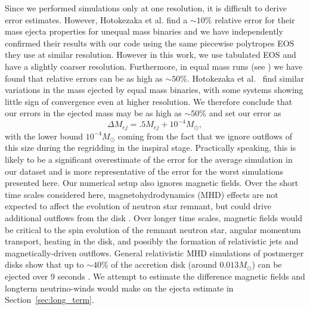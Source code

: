Since we performed simulations only at one resolution, it is difficult to derive error estimates. However, Hotokezaka et al. \cite{hotokezaka:13} find a $\sim 10\%$ relative error for their mass ejecta properties for unequal mass binaries and we have independently confirmed their results with our code using the same piecewise polytropes EOS they use at similar resolution. However in this work, we use tabulated EOS and have a slightly coarser resolution. Furthermore, in equal mass runs (see \cite{foucart:2015gaa}) we have found that relative errors can be as high as $\sim 50\%$. Hotokezaka et al.~\cite{hotokezaka:13} find similar variations in the mass ejected by equal mass binaries, with some systems showing little sign of convergence even at higher resolution. We therefore conclude that our errors in the ejected mass may be as high as $\sim 50\%$ and set our error as
%
\begin{equation}
\label{eqn:error}
  \Delta M_{ej} = .5M_{ej} + 10^{-4}M_\odot,
\end{equation}
%
with the lower bound $10^{-4}M_\odot$ coming from the fact that we ignore outflows of this size during the regridding in the inspiral stage. Practically speaking, this is likely to be a significant overestimate of the error for the average simulation in our dataset and is more representative of the error for the worst simulations presented here. %
Our numerical setup also ignores magnetic fields. Over the short time scales considered here, magnetohydrodynamics (MHD) effects are not expected to affect the evolution of neutron star remnant, but could drive additional outflows from the disk \cite{kiuchi2014,neilsen2014magnetized}. Over longer time scales, magnetic fields would be critical to the spin evolution of the remnant neutron star, angular momentum transport, heating in the disk, and possibly the formation of relativistic jets and magnetically-driven outflows. General relativistic MHD simulations of postmerger disks show
that up to $\sim 40\%$ of the accretion disk (around $0.013M_\odot$) can be ejected over 9 seconds \cite{fernandez2019long}. We attempt to estimate the difference magnetic fields and longterm neutrino-winds would make on the ejecta estimate in Section~\ref{sec:long_term}.

